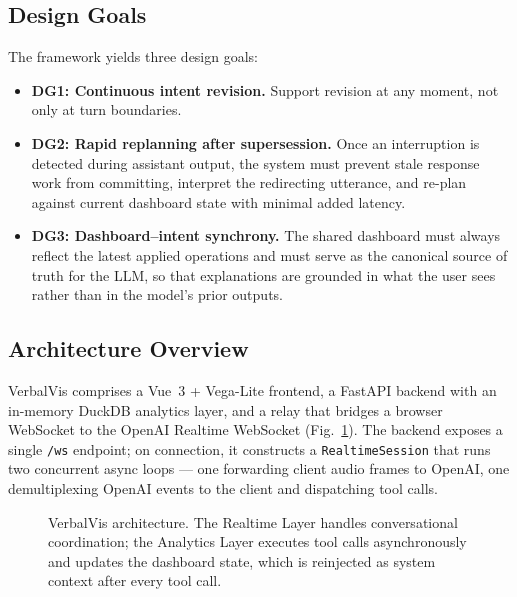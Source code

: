\documentclass[journal]{IEEEtran}
\begin{document}
\subsection{Design Goals}
The framework yields three design goals:
\begin{itemize}
\item \textbf{DG1: Continuous intent revision.} Support revision at any moment, not only at turn boundaries.
\item \textbf{DG2: Rapid replanning after supersession.} Once an interruption is detected during assistant output, the system must prevent stale response work from committing, interpret the redirecting utterance, and re-plan against current dashboard state with minimal added latency.
\item \textbf{DG3: Dashboard--intent synchrony.} The shared dashboard must always reflect the latest applied operations and must serve as the canonical source of truth for the LLM, so that explanations are grounded in what the user sees rather than in the model's prior outputs.
\end{itemize}

\subsection{Architecture Overview}
VerbalVis comprises a Vue~3 + Vega-Lite frontend, a FastAPI backend with an in-memory DuckDB analytics layer, and a relay that bridges a browser WebSocket to the OpenAI Realtime WebSocket (Fig.~\ref{fig:arch}). The backend exposes a single \texttt{/ws} endpoint; on connection, it constructs a \texttt{RealtimeSession} that runs two concurrent async loops --- one forwarding client audio frames to OpenAI, one demultiplexing OpenAI events to the client and dispatching tool calls.

\begin{figure}[t]
\centering
{}
\caption{VerbalVis architecture. The Realtime Layer handles conversational coordination; the Analytics Layer executes tool calls asynchronously and updates the dashboard state, which is reinjected as system context after every tool call.}
\label{fig:arch}
\end{figure}
\end{document}
